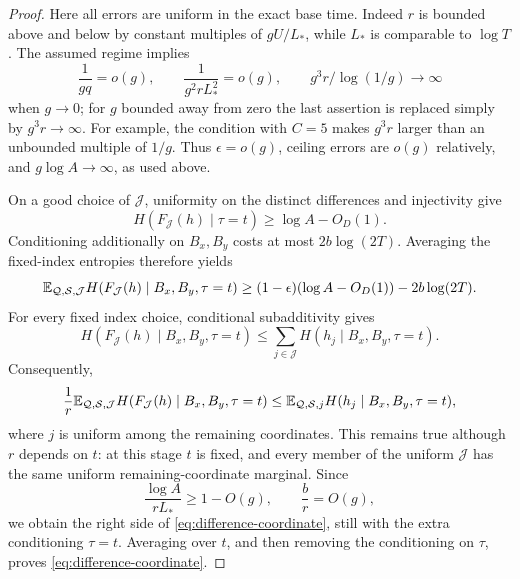 \begin{proof}
Here all errors are uniform in the exact base time.
Indeed \(r\) is bounded above and below by constant multiples of
\(gU/L_*\), while \(L_*\) is comparable to \(\log T\).
The assumed regime implies
\[
 \frac1{gq}=o(g),\qquad
 \frac1{g^2rL_*^2}=o(g),\qquad
 g^3r/\log(1/g)\longrightarrow\infty
\]
when \(g\to0\); for \(g\) bounded away from zero the last assertion
is replaced simply by \(g^3r\to\infty\).
For example, the condition with \(C=5\) makes
\(g^3r\) larger than an unbounded multiple of \(1/g\).
Thus \(\epsilon=o(g)\), ceiling errors are \(o(g)\) relatively,
and \(g\log A\to\infty\), as used above.

On a good choice of \(\mathcal J\), uniformity on the distinct
differences and injectivity give
\[
 H(F_{\mathcal J}(h)\mid\tau=t)\ge\log A-O_D(1).
\]
Conditioning additionally on \(B_x,B_y\) costs at most
\(2b\log(2T)\). Averaging the fixed-index entropies therefore yields
\[
 \mathbb E_{\mathcal Q,\mathcal S,\mathcal J}
 H(F_{\mathcal J}(h)\mid B_x,B_y,\tau=t)
 \ge (1-\epsilon)(\log A-O_D(1))-2b\log(2T).
\]
For every fixed index choice, conditional subadditivity gives
\[
 H(F_{\mathcal J}(h)\mid B_x,B_y,\tau=t)
 \le\sum_{j\in\mathcal J}H(h_j\mid B_x,B_y,\tau=t).
\]
Consequently,
\[
 \frac1r\mathbb E_{\mathcal Q,\mathcal S,\mathcal J}
 H(F_{\mathcal J}(h)\mid B_x,B_y,\tau=t)
 \le \mathbb E_{\mathcal Q,\mathcal S,j}
 H(h_j\mid B_x,B_y,\tau=t),
\]
where \(j\) is uniform among the remaining coordinates.
This remains true although \(r\) depends on \(t\): at this stage
\(t\) is fixed, and every member of the uniform \(\mathcal J\)
has the same uniform remaining-coordinate marginal.
Since
\[
 \frac{\log A}{rL_*}\ge1-O(g),\qquad \frac br=O(g),
\]
we obtain the right side of \eqref{eq:difference-coordinate},
still with the extra conditioning \(\tau=t\).
Averaging over \(t\), and then removing the conditioning on \(\tau\),
proves \eqref{eq:difference-coordinate}.


\end{proof}

